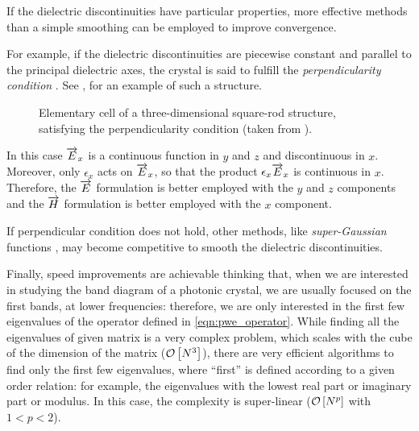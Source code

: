 If the dielectric discontinuities have particular properties, more
effective methods than a simple smoothing can be employed
to improve convergence.

For example, if the dielectric discontinuities are piecewise constant
and parallel to the principal dielectric axes, the crystal is said to
fulfill the \emph{perpendicularity condition}
\cite{lalanne_effective}. See , for an
example of such a structure.

\begin{figure}[htbp]
  \begin{center}
    \resizebox{5cm}{!}{}
  \end{center}
  \caption{Elementary cell of a three-dimensional square-rod
    structure, satisfying the perpendicularity condition (taken from
    \cite{lalanne_effective}).}
  \label{fig:lalanne_fig1}
\end{figure}

In this case $\overrightarrow{E}_x$ is a continuous function in $y$ and $z$ and
discontinuous in $x$. Moreover, only $\epsilon_x$ acts on $\overrightarrow{E}_x$, so
that the product $\epsilon_x \overrightarrow{E}_x$ is continuous in $x$. Therefore,
the $\overrightarrow{E}$ formulation is better employed with the $y$ and $z$
components and the $\overrightarrow{H}$ formulation is better employed with the $x$
component.

If perpendicular condition does not hold, other methods, like
\emph{super-Gaussian} functions \cite{villeneuve_photonic}, may become
competitive to smooth the dielectric discontinuities.

Finally, speed improvements are achievable thinking that, when we are
interested in studying the band diagram of a photonic crystal, we are
usually focused on the first bands, at lower frequencies: therefore,
we are only interested in the first few eigenvalues of the operator
defined in \ref{eqn:pwe_operator}. While finding all the eigenvalues
of given matrix is a very complex problem, which scales with the cube
of the dimension of the matrix ($\mathcal{O}\left[N^3\right]$), there are very efficient
algorithms to find only the first few eigenvalues, where ``first'' is
defined according to a given order relation: for example, the eigenvalues
with the lowest real part or imaginary part or modulus. In this case,
the complexity is super-linear ($\mathcal{O}\left[N^p\right]$ with $1 < p < 2$).

